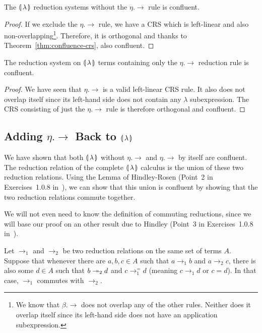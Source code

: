 \begin{lemma}\label{lem:confluence-int}

  The $\llparenthesis \, \lambda \, \rrparenthesis$ reduction systems without the $\eta.\to$ rule is
  confluent.
\end{lemma}

\begin{proof}
  If we exclude the $\eta.\to$ rule, we have a CRS which is left-linear and
  also non-overlapping\footnote{We know that $\beta.\to$ does not overlap
    any of the other rules. Neither does it overlap itself since its
    left-hand side does not have an application subexpression.}. Therefore,
  it is orthogonal and thanks to Theorem~\ref{thm:confluence-crs}, also
  confluent.
\end{proof}

\begin{lemma}\label{lem:confluence-eta}

  The reduction system on $\llparenthesis \, \lambda \, \rrparenthesis$ terms containing only the
  $\eta.\to$ reduction rule is confluent.
\end{lemma}

\begin{proof}
  We have seen that $\eta.\to$ is a valid left-linear CRS rule. It also
  does not overlap itself since its left-hand side does not contain any
  $\lambda$ subexpression. The CRS consisting of just the $\eta.\to$ rule
  is therefore orthogonal and confluent.
\end{proof}


\subsection{Adding $\eta.\to$ Back to $\llparenthesis \, \lambda \, \rrparenthesis$}

We have shown that both $\llparenthesis \, \lambda \, \rrparenthesis$ without $\eta.\to$ and
$\eta.\to$ by itself are confluent. The reduction relation of the complete
$\llparenthesis \, \lambda \, \rrparenthesis$ calculus is the union of these two reduction
relations. Using the Lemma of Hindley-Rosen (Point~2 in Exercises~1.0.8
in~\cite{klop1992term}), we can show that this union is confluent by
showing that the two reduction relations commute together.

We will not even need to know the definition of commuting reductions, since
we will base our proof on an other result due to Hindley (Point~3 in
Exercises~1.0.8 in~\cite{klop1992term}).

\begin{lemma}\label{lem:commutativity}
  Let $\to_1$ and $\to_2$ be two reduction relations on the same set of
  terms $A$. Suppose that whenever there are $a,b,c \in A$ such that
  $a \to_1 b$ and $a \to_2 c$, there is also some $d \in A$ such that
  $b \twoheadrightarrow_2 d$ and $c \to_1^= d$ (meaning $c \to_1 d$ or $c = d$). In that
  case, $\to_1$ commutes with $\to_2$.
\end{lemma}

